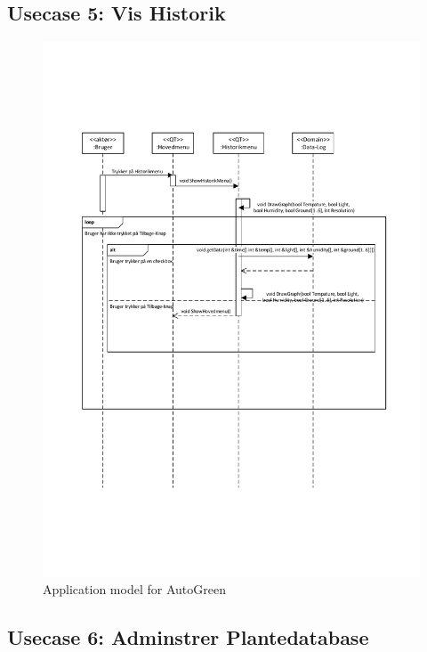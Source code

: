 \clearpage

\subsection{Usecase 5: Vis Historik}

\begin{figure}[!h]
\centering 
\includegraphics[width={\textwidth-1cm}, trim=0 0 0 0, clip=true] {../fig/SD_autogreen_UC_5_Vis_historik.pdf}
\caption{Application model for AutoGreen}
\label{fig:SD_UC5}
\end{figure}

\clearpage

\subsection{Usecase 6: Adminstrer Plantedatabase}

